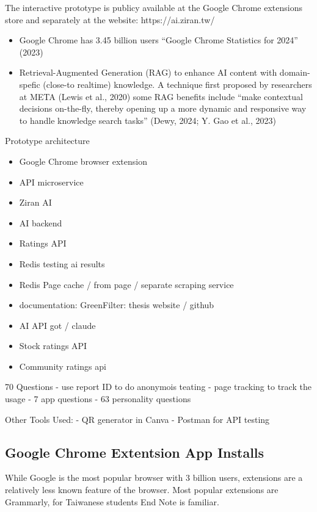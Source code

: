 \documentclass[
  12pt,
  letterpaper,
  DIV=11,
  numbers=noendperiod]{scrartcl}
\providecommand{\tightlist}{%
  \setlength{\itemsep}{0pt}\setlength{\parskip}{0pt}}
\begin{document}
The interactive prototype is publicy available at the Google Chrome
extensions store and separately at the website: https://ai.ziran.tw/

\begin{itemize}
\tightlist
\item
  Google Chrome has 3.45 billion users {``Google {Chrome Statistics} for
  2024''} (2023)
\item
  Retrieval-Augmented Generation (RAG) to enhance AI content with
  domain-spefic (close-to realtime) knowledge. A technique first
  proposed by researchers at META (Lewis et al., 2020) some RAG benefits
  include ``make contextual decisions on-the-fly, thereby opening up a
  more dynamic and responsive way to handle knowledge search tasks''
  (Dewy, 2024; Y. Gao et al., 2023)
\end{itemize}

Prototype architecture

\begin{itemize}
\item
  Google Chrome browser extension
\item
  API microservice
\item
  Ziran AI
\item
  AI backend
\item
  Ratings API
\item
  Redis testing ai results
\item
  Redis Page cache / from page / separate scraping service
\item
  documentation: GreenFilter: thesis website / github
\item
  AI API got / claude
\item
  Stock ratings API
\item
  Community ratings api
\end{itemize}

70 Questions - use report ID to do anonymois teating - page tracking to
track the usage - 7 app questions - 63 personality questions

Other Tools Used: - QR generator in Canva - Postman for API testing

\subsection{Google Chrome Extentsion App
Installs}\label{google-chrome-extentsion-app-installs}

While Google is the most popular browser with 3 billion users,
extensions are a relatively less known feature of the browser. Most
popular extensions are Grammarly, for Taiwanese students End Note is
familiar.
\end{document}
